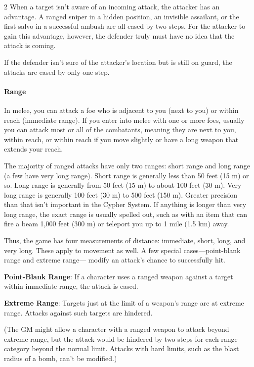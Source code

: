 \begin{multicols}{2}
When a target isn’t aware of an incoming attack, the attacker has an advantage. A ranged sniper in a hidden position, an invisible assailant, or the first salvo in a successful ambush are all eased by two steps. For the attacker to gain this advantage, however, the defender truly must have no idea that the attack is coming.

If the defender isn’t sure of the attacker’s location but is still on guard, the attacks are eased by only one step.

\paragraph{Range}

In melee, you can attack a foe who is adjacent to you (next to you) or within reach (immediate range). If you enter into melee with one or more foes, usually you can attack most or all of the combatants, meaning they are next to you, within reach, or within reach if you move slightly or have a long weapon that extends your reach.

The majority of ranged attacks have only two ranges: short range and long range (a few have very long range). Short range is generally less than 50 feet (15 m) or so. Long range is generally from 50 feet (15 m) to about 100 feet (30 m). Very long range is generally 100 feet (30 m) to 500 feet (150 m). Greater precision than that isn’t important in the Cypher System. If anything is longer than very long range, the exact range is usually spelled out, such as with an item that can fire a beam 1,000 feet (300 m) or teleport you up to 1 mile (1.5 km) away.

Thus, the game has four measurements of distance: immediate, short, long, and very long. These apply to movement as well. A few special cases—point-blank range and extreme range— modify an attack’s chance to successfully hit.

\textbf{Point-Blank Range}: If a character uses a ranged weapon against a target within immediate range, the attack is eased.

\textbf{Extreme Range}: Targets just at the limit of a weapon’s range are at extreme range. Attacks against such targets are hindered.

(The GM might allow a character with a ranged weapon to attack beyond extreme range, but the attack would be hindered by two steps for each range category beyond the normal limit. Attacks with hard limits, such as the blast radius of a bomb, can’t be modified.)


\end{multicols}
